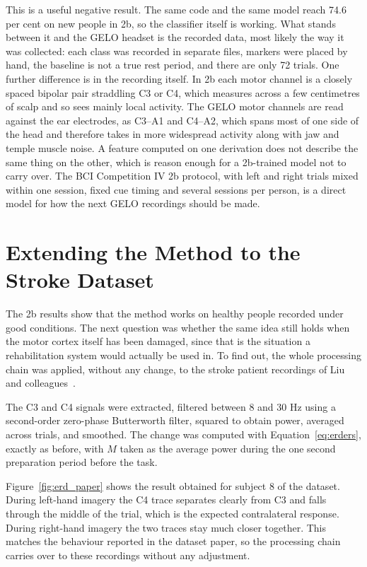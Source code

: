 This is a useful negative result. The same code and the same model reach 74.6 per cent on
new people in 2b, so the classifier itself is working. What stands between it and the
GELO headset is the recorded data, most likely the way it was collected: each class was
recorded in separate files, markers were placed by hand, the baseline is not a true rest
period, and there are only 72 trials. One further difference is in the recording itself.
In 2b each motor channel is a closely spaced bipolar pair straddling C3 or C4, which
measures across a few centimetres of scalp and so sees mainly local activity. The GELO
motor channels are read against the ear electrodes, as C3--A1 and C4--A2, which spans most
of one side of the head and therefore takes in more widespread activity along with jaw and
temple muscle noise. A feature computed on one derivation does not describe the same thing
on the other, which is reason enough for a 2b-trained model not to carry over. The BCI Competition IV 2b protocol, with left and
right trials mixed within one session, fixed cue timing and several sessions per person,
is a direct model for how the next GELO recordings should be made.

\FloatBarrier

\section{Extending the Method to the Stroke Dataset}
\label{sec:stroke_repro}

The 2b results show that the method works on healthy people recorded under good
conditions. The next question was whether the same idea still holds when the motor cortex
itself has been damaged, since that is the situation a rehabilitation system would
actually be used in. To find out, the whole processing chain was applied, without any
change, to the stroke patient recordings of Liu and colleagues~\cite{liu2024mi}.

The C3 and C4 signals were extracted, filtered between 8 and 30 Hz using a second-order
zero-phase Butterworth filter, squared to obtain power, averaged across trials, and
smoothed. The change was computed with Equation~\ref{eq:erders}, exactly as before, with
$M$ taken as the average power during the one second preparation period before the task.

Figure~\ref{fig:erd_paper} shows the result obtained for subject 8 of the dataset. During
left-hand imagery the C4 trace separates clearly from C3 and falls through the middle of
the trial, which is the expected contralateral response. During right-hand imagery the two
traces stay much closer together. This matches the behaviour reported in the dataset
paper, so the processing chain carries over to these recordings without any adjustment.

